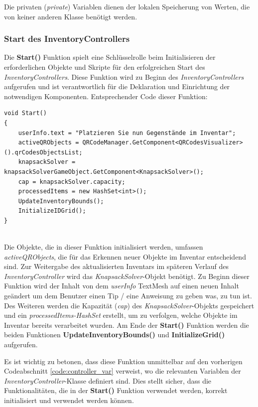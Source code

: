 Die privaten (\textit{private}) Variablen dienen der lokalen Speicherung von Werten, die von keiner anderen Klasse benötigt
werden.

\subsubsection{Start des InventoryControllers}

Die \textbf{Start()} Funktion spielt eine Schlüsselrolle beim Initialisieren der erforderlichen Objekte und Skripte für den
erfolgreichen Start des \textit{InventoryControllers}. Diese Funktion wird zu Beginn des \textit{InventoryControllers}
aufgerufen und ist verantwortlich für die Deklaration und Einrichtung der notwendigen Komponenten. Entsprechender Code
dieser Funktion:
\begin{lstlisting}[style=csharp, caption={Start Funktion des InventoryControllers}, label=code:controller_start]
void Start()
{
    userInfo.text = "Platzieren Sie nun Gegenstände im Inventar";
    activeQRObjects = QRCodeManager.GetComponent<QRCodesVisualizer>().qrCodesObjectsList;
    knapsackSolver = knapsackSolverGameObject.GetComponent<KnapsackSolver>();
    cap = knapsackSolver.capacity;
    processedItems = new HashSet<int>();
    UpdateInventoryBounds();
    InitializeIDGrid();
}
\end{lstlisting}\\
Die Objekte, die in dieser Funktion initialisiert werden, umfassen \textit{activeQRObjects}, die für das Erkennen neuer
Objekte im Inventar entscheidend sind. Zur Weitergabe des aktualisierten Inventars im späteren Verlauf des \textit{InventoryController}
wird das \textit{KnapsackSolver}-Objekt benötigt. Zu Beginn dieser Funktion wird der Inhalt von dem \textit{userInfo}
TextMesh auf einen neuen Inhalt geändert um dem Benutzer einen Tip / eine Anweisung zu geben was, zu tun ist. Des Weiteren
werden die Kapazität (\textit{cap}) des \textit{KnapsackSolver}-Objekts gespeichert und ein \textit{processedItems-HashSet}
erstellt, um zu verfolgen, welche Objekte im Inventar bereits verarbeitet wurden. Am Ende der \textbf{Start()} Funktion
werden die beiden Funktionen \textbf{UpdateInventoryBounds()} und \textbf{InitializeGrid()} aufgerufen.

Es ist wichtig zu betonen, dass diese Funktion unmittelbar auf den vorherigen Codeabschnitt \ref{code:controller_var}
verweist, wo die relevanten Variablen der \textit{InventoryController}-Klasse definiert sind. Dies stellt sicher, dass
die Funktionalitäten, die in der \textbf{Start()} Funktion verwendet werden, korrekt initialisiert und verwendet werden
können.

